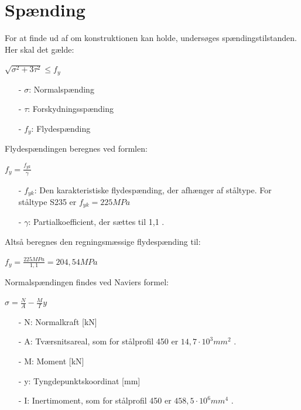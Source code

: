 \section{Spænding}
For at finde ud af om konstruktionen kan holde, undersøges spændingstilstanden. Her skal det gælde:

\begin{center}
	$\sqrt{\sigma^2 + 3\tau^2} \leq f_y$ 
\end{center}

\begin{itemize}
	\item[-] $\sigma$: Normalspænding
	\item[-] $\tau$: Forskydningsspænding
	\item[-] $f_y$: Flydespænding
\end{itemize}

Flydespændingen beregnes ved formlen:

\begin{center}
	$f_y = \frac{f_{yk}}{\gamma}$
\end{center}

\begin{itemize}
	\item[-] $f_{yk}$: Den karakteristiske flydespænding, der afhænger af ståltype. For ståltype S235 er $f_{yk} = 225 MPa$
	\item[-] $\gamma$: Partialkoefficient, der sættes til 1,1 \citep[ s. 212]{stabi}.  
\end{itemize}

Altså beregnes den regningsmæssige flydespænding til:

\begin{center}
	$f_y = \frac{225 MPa}{1,\!1} = 204,\!54 MPa$
\end{center}

Normalspændingen findes ved Naviers formel:

\begin{center}
	$\sigma = \frac{N}{A} - \frac{M}{I} y$
\end{center}

\begin{itemize}
	\item[-] N: Normalkraft [kN]
	\item[-] A: Tværsnitsareal, som for stålprofil 450 er $14,\!7 \cdot 10^3 mm^2$ \citep{stabi}. 
	\item[-] M: Moment [kN]
	\item[-] y: Tyngdepunktskoordinat [mm]
	\item[-] I: Inertimoment, som for stålprofil 450 er $458,\!5 \cdot 10^6 mm^4$ \citep{stabi}. 
\end{itemize} 

